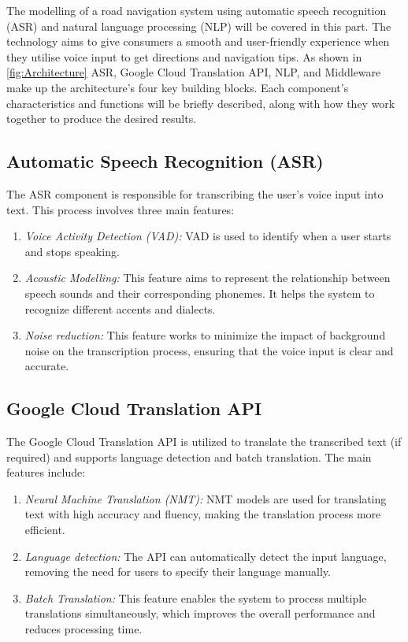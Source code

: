 \documentclass{epsrc}
\begin{document}
The modelling of a road navigation system using automatic speech recognition (ASR) and natural language processing (NLP) will be covered in this part. The technology aims to give consumers a smooth and user-friendly experience when they utilise voice input to get directions and navigation tips. As shown in \ref{fig:Architecture} ASR, Google Cloud Translation API, NLP, and Middleware make up the architecture's four key building blocks. Each component's characteristics and functions will be briefly described, along with how they work together to produce the desired results.
\vspace{5pt}

\subsection{Automatic Speech Recognition (ASR)}
The ASR component is responsible for transcribing the user's voice input into text. This process involves three main features:
\begin{enumerate}
    \item {\em Voice Activity Detection (VAD):} VAD is used to identify when a user starts and stops speaking.\cite{7995777}
    \item {\em Acoustic Modelling:} This feature aims to represent the relationship between speech sounds and their corresponding phonemes. It helps the system to recognize different accents and dialects.\cite{7995777}
    \item {\em Noise reduction:} This feature works to minimize the impact of background noise on the transcription process, ensuring that the voice input is clear and accurate.
\end{enumerate}
\vspace{5pt}

\subsection{Google Cloud Translation API}
The Google Cloud Translation API is utilized to translate the transcribed text (if required) and supports language detection and batch translation. The main features include:
\begin{enumerate}
    \item {\em Neural Machine Translation (NMT):} NMT models are used for translating text with high accuracy and fluency, making the translation process more efficient.
    \item {\em Language detection:} The API can automatically detect the input language, removing the need for users to specify their language manually.
    \item {\em Batch Translation:} This feature enables the system to process multiple translations simultaneously, which improves the overall performance and reduces processing time.
\end{enumerate}
\vspace{5pt}
\end{document}
